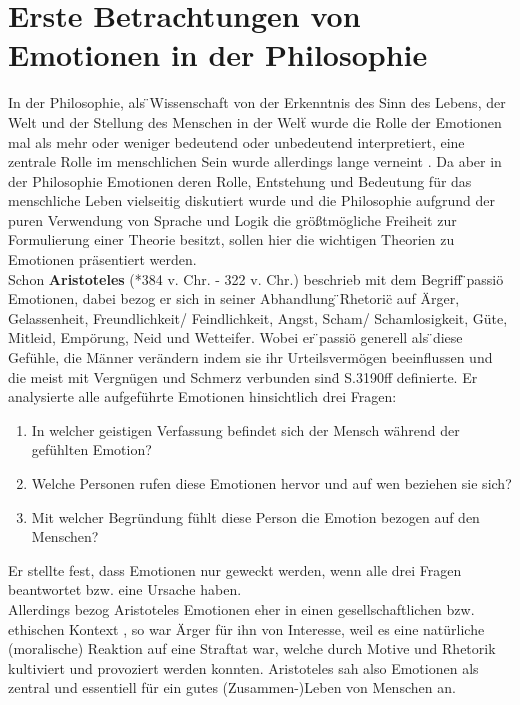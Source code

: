 \section{Erste Betrachtungen von Emotionen in der Philosophie}
In der Philosophie, als \"{}Wissenschaft von der Erkenntnis des Sinn des Lebens, der Welt und der Stellung des Menschen in der Welt\"{} wurde die Rolle der Emotionen mal als mehr oder weniger bedeutend oder unbedeutend interpretiert, eine zentrale Rolle im menschlichen Sein wurde allerdings lange verneint \cite{robert_c._solomon_philosophy_2008}. Da aber in der Philosophie Emotionen deren Rolle, Entstehung und Bedeutung für das menschliche Leben vielseitig diskutiert wurde und die Philosophie aufgrund der puren Verwendung von Sprache und Logik die größtmögliche Freiheit zur Formulierung einer Theorie besitzt, sollen hier die wichtigen Theorien zu Emotionen präsentiert werden.\\
%
%
Schon \textbf{Aristoteles} (*384 v. Chr. - 322 v. Chr.) beschrieb mit dem Begriff  \"{}passio\"{} Emotionen, dabei bezog er sich in seiner Abhandlung  \"{}Rhetoric\"{} auf Ärger, Gelassenheit, Freundlichkeit/ Feindlichkeit, Angst, Scham/ Schamlosigkeit, Güte,  Mitleid, Empörung, Neid und Wetteifer. Wobei er  \"{}passio\"{} generell als  \"{}diese Gefühle, die Männer verändern indem sie ihr Urteilsvermögen beeinflussen und die meist mit Vergnügen und Schmerz verbunden sind\"{} \cite{aristotle_categories_1938} S.3190ff definierte. Er analysierte alle aufgeführte Emotionen hinsichtlich drei Fragen:
\begin{enumerate}
\item In welcher geistigen Verfassung befindet sich der Mensch während der gefühlten Emotion?
\item Welche Personen rufen diese Emotionen hervor und auf wen beziehen sie sich?
\item Mit welcher Begründung fühlt diese Person die Emotion bezogen auf den Menschen?
\end{enumerate}
Er stellte fest, dass Emotionen nur geweckt werden, wenn alle drei Fragen beantwortet bzw. eine Ursache haben.\\
Allerdings bezog Aristoteles Emotionen eher in einen gesellschaftlichen bzw. ethischen Kontext \cite{robert_c._solomon_philosophy_2008}, so war Ärger für ihn von Interesse, weil es eine natürliche (moralische) Reaktion auf eine Straftat war, welche durch Motive und Rhetorik kultiviert und provoziert werden konnten. Aristoteles sah also Emotionen als zentral und essentiell für ein gutes (Zusammen-)Leben von Menschen \cite{robert_c._solomon_philosophy_2008} an.\\
